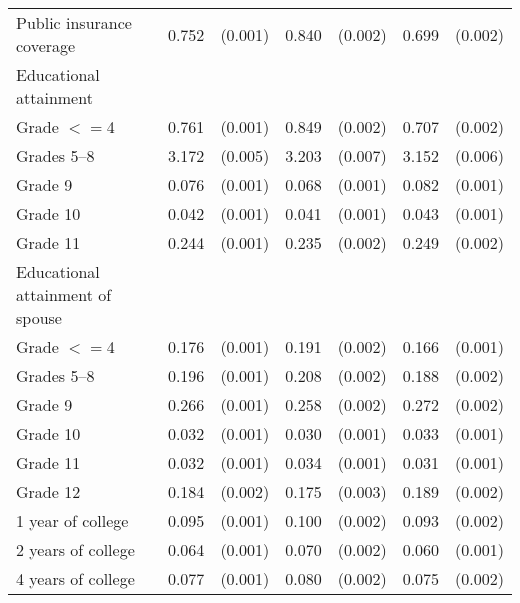 \begin{tabular}{lcccccc}
 \hspace{0.3cm}  Public insurance coverage  & 0.752 & (0.001)  & 0.840 & (0.002)  & 0.699 & (0.002)  \\
 Educational attainment  & & &  \\
 \hspace{0.3cm} Grade $<=$4  & 0.761 & (0.001)  & 0.849 & (0.002)  & 0.707 & (0.002)  \\
 \hspace{0.3cm}  Grades 5--8  & 3.172 & (0.005)  & 3.203 & (0.007)  & 3.152 & (0.006)  \\
 \hspace{0.3cm} Grade 9  & 0.076 & (0.001)  & 0.068 & (0.001)  & 0.082 & (0.001)  \\
 \hspace{0.3cm} Grade 10  & 0.042 & (0.001)  & 0.041 & (0.001)  & 0.043 & (0.001)  \\
 \hspace{0.3cm} Grade 11  & 0.244 & (0.001)  & 0.235 & (0.002)  & 0.249 & (0.002)  \\
 Educational attainment of spouse  & & &  \\
 \hspace{0.3cm} Grade $<=$4  & 0.176 & (0.001)  & 0.191 & (0.002)  & 0.166 & (0.001)  \\
 \hspace{0.3cm}  Grades 5--8  & 0.196 & (0.001)  & 0.208 & (0.002)  & 0.188 & (0.002)  \\
 \hspace{0.3cm} Grade 9  & 0.266 & (0.001)  & 0.258 & (0.002)  & 0.272 & (0.002)  \\
 \hspace{0.3cm} Grade 10  & 0.032 & (0.001)  & 0.030 & (0.001)  & 0.033 & (0.001)  \\
 \hspace{0.3cm} Grade 11  & 0.032 & (0.001)  & 0.034 & (0.001)  & 0.031 & (0.001)  \\
 \hspace{0.3cm} Grade 12  & 0.184 & (0.002)  & 0.175 & (0.003)  & 0.189 & (0.002)  \\
 \hspace{0.3cm} 1 year of college  & 0.095 & (0.001)  & 0.100 & (0.002)  & 0.093 & (0.002)  \\
 \hspace{0.3cm} 2 years of college  & 0.064 & (0.001)  & 0.070 & (0.002)  & 0.060 & (0.001)  \\
 \hspace{0.3cm} 4 years of college  & 0.077 & (0.001)  & 0.080 & (0.002)  & 0.075 & (0.002)  \\

\end{tabular}
